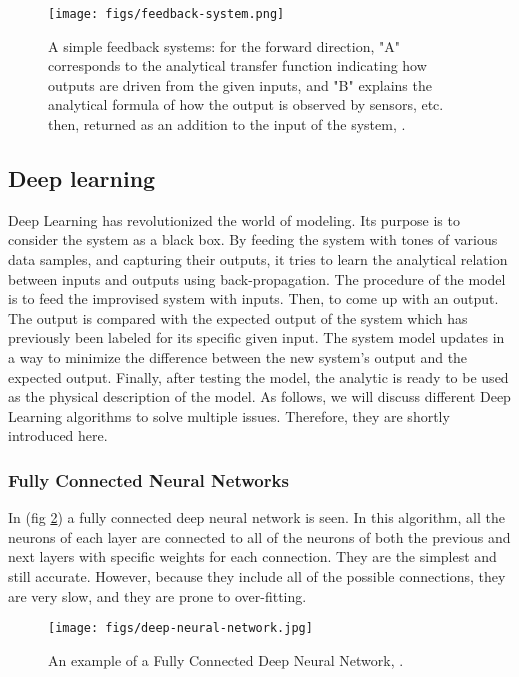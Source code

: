 \documentclass[conference, 11pt]{IEEEtran}
\begin{document}
	\begin{figure}[!htbp]
		\texttt{[image: figs/feedback-system.png]}
		\centering
		\caption{A simple feedback systems: for the forward direction, "A" corresponds to the analytical transfer function indicating how outputs are driven from the given inputs, and "B" explains the analytical formula of how the output is observed by sensors, etc. then, returned as an addition to the input of the system, \cite{wiki:control-systems}.
			\label{img:feedback}}
	\end{figure}
	
	\subsection{Deep learning \cite{wiki:dnn}}
	Deep Learning has revolutionized the world of modeling. Its purpose is to consider the system as a black box. By feeding the system with tones of various data samples, and capturing their outputs, it tries to learn the analytical relation between inputs and outputs using back-propagation. The procedure of the model is to feed the improvised system with inputs. Then, to come up with an output. The output is compared with the expected output of the system which has previously been labeled for its specific given input. The system model updates in a way to minimize the difference between the new system's output and the expected output. Finally, after testing the model, the analytic is ready to be used as the physical description of the model. As follows, we will discuss different Deep Learning algorithms to solve multiple issues. Therefore, they are shortly introduced here.
	
	\subsubsection{Fully Connected Neural Networks \cite{Ozcan2019}}
	In (fig \ref{img:mlp}) a fully connected deep neural network is seen. In this algorithm, all the neurons of each layer are connected to all of the neurons of both the previous and next layers with specific weights for each connection. They are the simplest and still accurate. However, because they include all of the possible connections, they are very slow, and they are prone to over-fitting.
	
	
	\begin{figure}[!htbp]
		\texttt{[image: figs/deep-neural-network.jpg]}
		\centering
		\caption{An example of a Fully Connected Deep Neural Network, \cite{wiki:ann}.
			\label{img:mlp}}
	\end{figure}
	
\end{document}
